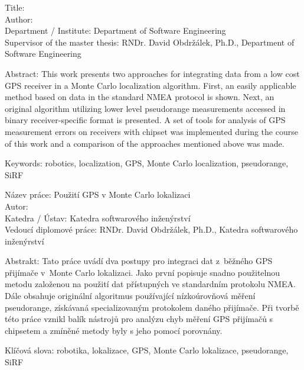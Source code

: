 \noindent
Title: \thetitle\\
Author: \theauthor\\
Department / Institute: Department of Software Engineering\\
Supervisor of the master thesis: RNDr. David Obdržálek, Ph.D., Department of Software Engineering

\vspace{5mm}

\noindent
Abstract: This work presents two approaches for integrating data from a low
cost GPS receiver in a Monte Carlo localization algorithm.
First, an easily applicable method based on data in the standard NMEA protocol is shown.
Next, an original algorithm utilizing lower level pseudorange measurements accessed in
binary receiver-specific format is presented.
A set of tools for analysis of GPS measurement errors on receivers
with \sirf chipset was implemented during the course of this work
and a comparison of the approaches mentioned above was made.

\vspace{5mm}

\noindent
Keywords: robotics, localization, GPS, Monte Carlo localization, pseudorange, SiRF

\vspace{25mm}

\noindent
Název práce: Použití GPS v Monte Carlo lokalizaci\\
Autor: \theauthor\\
Katedra / Ústav: Katedra softwarového inženýrství\\
Vedoucí diplomové práce: RNDr. David Obdržálek, Ph.D., Katedra softwarového inženýrství

\vspace{5mm}

\noindent
Abstrakt: Tato práce uvádí dva postupy pro integraci dat z~běžného GPS přijímače
v~Monte Carlo lokalizaci.
Jako první popisuje snadno použitelnou metodu založenou na použití dat přístupných ve standardním
protokolu NMEA.
Dále obsahuje originální algoritmus používající nízkoúrovňová měření pseudorange,
získávaná specializovaným protokolem daného přijímače.
Při tvorbě této práce vznikl balík nástrojů pro analýzu chyb měření GPS přijímačů
s chipsetem \sirf a zmíněné metody byly s jeho pomocí porovnány.

\vspace{5mm}

\noindent
Klíčová slova: robotika, lokalizace, GPS, Monte Carlo lokalizace, pseudorange, SiRF

\cleartorecto

